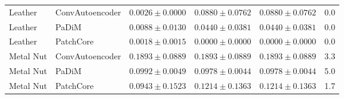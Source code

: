 \begin{table}[t]
{\begin{tabular}{llcccc}
\midrule
Leather & ConvAutoencoder & $0.0026 \pm 0.0000$ & $0.0880 \pm 0.0762$ & $0.0880 \pm 0.0762$ & 0.0 \\
Leather & PaDiM & $0.0088 \pm 0.0130$ & $0.0440 \pm 0.0381$ & $0.0440 \pm 0.0381$ & 0.0 \\
Leather & PatchCore & $0.0018 \pm 0.0015$ & $0.0000 \pm 0.0000$ & $0.0000 \pm 0.0000$ & 0.0 \\
\midrule
Metal Nut & ConvAutoencoder & $0.1893 \pm 0.0889$ & $0.1893 \pm 0.0889$ & $0.1893 \pm 0.0889$ & 3.3 \\
Metal Nut & PaDiM & $0.0992 \pm 0.0049$ & $0.0978 \pm 0.0044$ & $0.0978 \pm 0.0044$ & 5.0 \\
Metal Nut & PatchCore & $0.0943 \pm 0.1523$ & $0.1214 \pm 0.1363$ & $0.1214 \pm 0.1363$ & 1.7 \\
\bottomrule
\end{tabular}}
\end{table}
